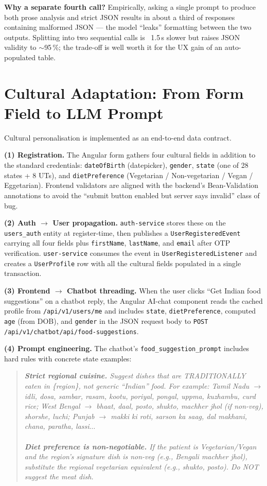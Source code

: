 \documentclass[12pt]{caltech_thesis}
\begin{document}
\textbf{Why a separate fourth call?} Empirically, asking a single
prompt to produce both prose analysis and strict JSON results in
about a third of responses containing malformed JSON --- the model
``leaks'' formatting between the two outputs. Splitting into two
sequential calls is ~1.5\,s slower but raises JSON validity to
$\sim$95\,\%; the trade-off is well worth it for the UX gain of an
auto-populated table.

\section{Cultural Adaptation: From Form Field to LLM Prompt}
\label{sec:cultural}

Cultural personalisation is implemented as an end-to-end data contract.

\textbf{(1) Registration.} The Angular form gathers four cultural fields
in addition to the standard credentials: \texttt{dateOfBirth} (datepicker),
\texttt{gender}, \texttt{state} (one of 28 states + 8 UTs), and
\texttt{dietPreference} (Vegetarian / Non-vegetarian / Vegan / Eggetarian).
Frontend validators are aligned with the backend's Bean-Validation
annotations to avoid the ``submit button enabled but server says invalid''
class of bug.

\textbf{(2) Auth $\to$ User propagation.} \texttt{auth-service} stores
these on the \texttt{users\_auth} entity at register-time, then publishes
a \texttt{UserRegisteredEvent} carrying all four fields plus
\texttt{firstName}, \texttt{lastName}, and \texttt{email} after OTP
verification. \texttt{user-service} consumes the event in
\texttt{UserRegisteredListener} and creates a \texttt{UserProfile} row
with all the cultural fields populated in a single transaction.

\textbf{(3) Frontend $\to$ Chatbot threading.} When the user clicks
``Get Indian food suggestions'' on a chatbot reply, the Angular AI-chat
component reads the cached profile from \texttt{/api/v1/users/me} and
includes \texttt{state}, \texttt{dietPreference}, computed \texttt{age}
(from DOB), and \texttt{gender} in the JSON request body to
\texttt{POST /api/v1/chatbot/api/food-suggestions}.

\textbf{(4) Prompt engineering.} The chatbot's \texttt{food\_suggestion\_prompt}
includes hard rules with concrete state examples:

\begin{quote}\itshape
\textbf{Strict regional cuisine.} Suggest dishes that are TRADITIONALLY
eaten in \{region\}, not generic ``Indian'' food. For example: Tamil
Nadu $\rightarrow$ idli, dosa, sambar, rasam, kootu, poriyal, pongal,
uppma, kuzhambu, curd rice; West Bengal $\rightarrow$ bhaat, daal, posto,
shukto, machher jhol (if non-veg), shorshe, luchi; Punjab $\rightarrow$
makki ki roti, sarson ka saag, dal makhani, chana, paratha, lassi$\ldots$
\\\\
\textbf{Diet preference is non-negotiable.} If the patient is
Vegetarian/Vegan and the region's signature dish is non-veg (e.g.,
Bengali machher jhol), substitute the regional vegetarian equivalent
(e.g., shukto, posto). Do NOT suggest the meat dish.
\end{quote}
\end{document}
